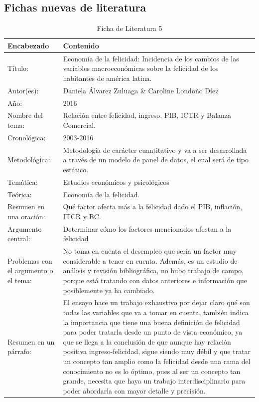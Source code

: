 \subsection{Fichas nuevas de literatura}
\begin{table}[!ht]
    \caption{Ficha de Literatura 5}
    \begin{center}
        \begin{tabular}{  m{3cm} | m{12cm}  }
        \hline\textbf{ Encabezado} & \textbf{Contenido }\\ \hline
        Título: & Economía de la felicidad: Incidencia de los cambios de las variables macroeconómicas sobre la felicidad de los habitantes de américa latina. \\ \hline
        Autor(es): & Daniela Álvarez Zuluaga \& Caroline Londoño Díez  \\ \hline
        Año: & 2016 \\ \hline
        Nombre del tema: & Relación entre felicidad, ingreso, PIB, ICTR y Balanza Comercial. \\ \hline
        Cronológica: &  2003-2016 \\ \hline
        Metodológica: & Metodología de carácter cuantitativo y va a ser desarrollada a través de un modelo de panel de datos, el cual será de tipo estático. \\ \hline
        Temática: & Estudios económicos y psicológicos \\  \hline
        Teórica: & Economía de la felicidad. \\ \hline
        Resumen en una oración: & Qué factor afecta más a la felicidad dado el PIB, inflación, ITCR y BC. \\ \hline
        Argumento central: &  Determinar cómo los factores mencionados afectan a la felicidad \\ \hline
        Problemas con el argumento o el tema: & No toma en cuenta el desempleo que sería un factor muy considerable a tener en cuenta. Además, es un estudio de análisis y revisión bibliográfica, no hubo trabajo de campo, porque está tratando con datos anteriores e información que posiblemente ya ha cambiado. \\ \hline
        Resumen en un párrafo: & El ensayo hace un trabajo exhaustivo por dejar claro qué son todas las variables que va a tomar en cuenta, también indica la importancia que tiene una buena definición de felicidad para poder tratarla desde un punto de vista económico, ya que se llega a la conclusión de que aunque hay relación positiva ingreso-felicidad, sigue siendo muy débil y que tratar un concepto tan amplio como la felicidad desde una rama del conocimiento no es lo óptimo, pues al ser un concepto tan grande, necesita que haya un trabajo interdisciplinario para poder abordarla con mayor detalle y precisión. \\ \hline
        \end{tabular}
    \end{center}
\end{table}

